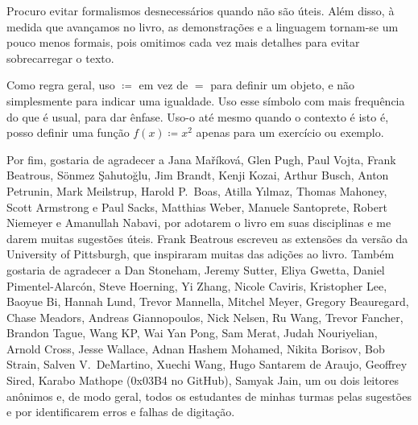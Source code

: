 Procuro evitar formalismos desnecessários quando não são úteis.
Além disso, à medida que avançamos no livro, as demonstrações e a linguagem
tornam-se um pouco menos formais, pois omitimos cada vez mais detalhes para
evitar sobrecarregar o texto.

Como regra geral, uso $\coloneqq$ em vez de $=$ para definir um objeto, e não
simplesmente para indicar uma igualdade. Uso esse símbolo com mais frequência
do que é usual, para dar ênfase.
Uso-o até mesmo quando o contexto é  isto é, posso definir
uma função $f(x) \coloneqq x^2$ apenas para um exercício ou exemplo.

\medskip

Por fim, gostaria de agradecer a Jana Ma\v{r}\'ikov\'a,
Glen Pugh, Paul Vojta, Frank Beatrous, S\"{o}nmez \c{S}ahuto\u{g}lu,
Jim Brandt, Kenji Kozai, Arthur Busch,  Anton Petrunin,
Mark Meilstrup, Harold P.\ Boas, Atilla Y{\i}lmaz,
Thomas Mahoney, Scott Armstrong e Paul Sacks,
Matthias Weber, Manuele Santoprete,
Robert Niemeyer e Amanullah Nabavi,
por adotarem o livro em suas disciplinas e me darem muitas sugestões úteis.
Frank Beatrous escreveu as extensões da versão da University of Pittsburgh,
que inspiraram muitas das adições ao livro.
Também gostaria de agradecer a
Dan Stoneham, Jeremy Sutter, Eliya Gwetta, Daniel Pimentel-Alarc\'on,
Steve Hoerning, Yi Zhang, Nicole Caviris,
Kristopher Lee, Baoyue Bi, Hannah Lund,
Trevor Mannella, Mitchel Meyer, Gregory Beauregard,
Chase Meadors, Andreas Giannopoulos, Nick Nelsen,
Ru Wang, Trevor Fancher, Brandon Tague, Wang KP\@,
Wai Yan Pong, Sam Merat, Judah Nouriyelian,
Arnold Cross, Jesse Wallace,
Adnan Hashem Mohamed,
Nikita Borisov, Bob Strain,
Salven V.\ DeMartino,
Xuechi Wang,
Hugo Santarem de Araujo,
Geoffrey Sired,
Karabo Mathope (0x03B4 no GitHub),
Samyak Jain,
um ou dois leitores anônimos e, de modo geral, todos os estudantes de minhas
turmas
pelas sugestões e por identificarem erros e falhas de digitação.

\VolTwoIntro

